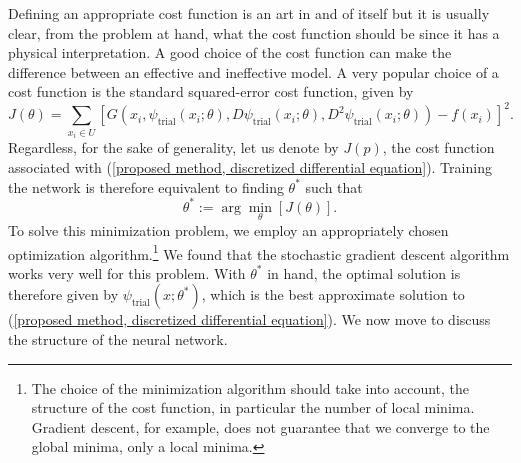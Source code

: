 \documentclass[10pt]{article}
\theoremstyle{plain}
\theoremstyle{definition}
\theoremstyle{remark}
\numberwithin{theorem}{section}
\numberwithin{proposition}{section}
\numberwithin{remark}{section}
\numberwithin{corollary}{section}
\numberwithin{definition}{section}
\numberwithin{lemma}{section}
\numberwithin{equation}{section}
\DeclareMathOperator{\T}{trial}
\begin{document}
Defining an appropriate cost function is an art in and of itself but it is usually clear, from the problem at hand, what the cost function should be since it has a physical interpretation. A good choice of the cost function can make the difference between an effective and ineffective model. A very popular choice of a cost function is the standard squared-error cost function, given by 
\begin{equation}
	\label{cost function, squared-error cost function}
	\displaystyle J(\theta) = \sum\limits_{x_i \in U}{[G(x_i, \psi_{\T}(x_i;\theta), D\psi_{\T}(x_i;\theta), D^2\psi_{\T}(x_i;\theta)) - f(x_i)]^2}. 
\end{equation}
Regardless, for the sake of generality, let us denote by $J(p)$, the cost function associated with (\ref{proposed method, discretized differential equation}). Training the network is therefore equivalent to finding $\theta^*$ such that
\begin{equation*}
	\displaystyle \theta^* := \arg\min\limits_{\theta}{[J(\theta)]}.
\end{equation*}
To solve this minimization problem, we employ an appropriately chosen optimization algorithm.\footnote{The choice of the minimization algorithm should take into account, the structure of the cost function, in particular the number of local minima. Gradient descent, for example, does not guarantee that we converge to the global minima, only a local minima.} We found that the stochastic gradient descent algorithm works very well for this problem. With $\theta^*$ in hand, the optimal solution is therefore given by $\psi_{\T}(x;\theta^*)$, which is the best approximate solution to (\ref{proposed method, discretized differential equation}). We now move to discuss the structure of the neural network. 
\end{document}
